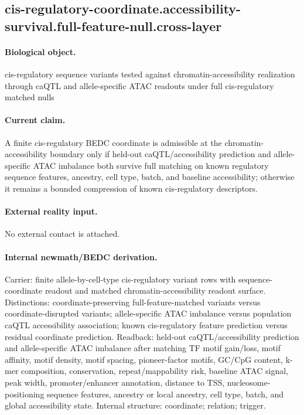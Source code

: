 \subsection{cis-regulatory-coordinate.accessibility-survival.full-feature-null.cross-layer}

\paragraph{Biological object.} cis-regulatory sequence variants tested against chromatin-accessibility realization through caQTL and allele-specific ATAC readouts under full cis-regulatory matched nulls

\paragraph{Current claim.} A finite cis-regulatory BEDC coordinate is admissible at the chromatin-accessibility boundary only if held-out caQTL/accessibility prediction and allele-specific ATAC imbalance both survive full matching on known regulatory sequence features, ancestry, cell type, batch, and baseline accessibility; otherwise it remains a bounded compression of known cis-regulatory descriptors.

\paragraph{External reality input.}
No external contact is attached.

\paragraph{Internal newmath/BEDC derivation.} Carrier: finite allele-by-cell-type cis-regulatory variant rows with sequence-coordinate readout and matched chromatin-accessibility readout surface. Distinctions: coordinate-preserving full-feature-matched variants versus coordinate-disrupted variants; allele-specific ATAC imbalance versus population caQTL accessibility association; known cis-regulatory feature prediction versus residual coordinate prediction. Readback: held-out caQTL/accessibility prediction and allele-specific ATAC imbalance after matching TF motif gain/loss, motif affinity, motif density, motif spacing, pioneer-factor motifs, GC/CpG content, k-mer composition, conservation, repeat/mappability risk, baseline ATAC signal, peak width, promoter/enhancer annotation, distance to TSS, nucleosome-positioning sequence features, ancestry or local ancestry, cell type, batch, and global accessibility state. Internal structure: coordinate; relation; trigger.

